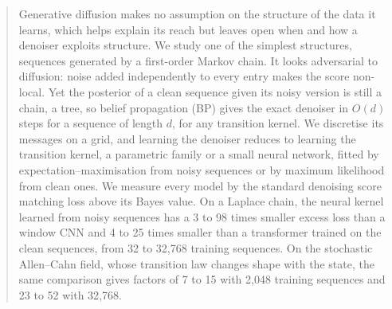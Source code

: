 \documentclass{article}
\begin{document}

\printAffiliationsAndNotice{}

\begin{abstract}
Generative diffusion makes no assumption on the structure of the data it learns, which helps explain its reach but
leaves open when and how a denoiser exploits structure. We study one of the simplest structures, sequences generated by
a first-order Markov chain. It looks adversarial to diffusion: noise added independently to every entry makes the score
non-local. Yet the posterior of a clean sequence given its noisy version is still a chain, a tree, so belief propagation
(BP) gives the exact denoiser in $O(d)$ steps for a sequence of length $d$, for any transition kernel. We discretise
its messages on a grid, and learning the denoiser reduces to learning the transition kernel, a parametric family or a
small neural network, fitted by expectation--maximisation from noisy sequences or by maximum likelihood from clean
ones. We measure every model by the standard denoising score matching loss above its Bayes value. On a Laplace chain,
the neural kernel learned from noisy sequences has a 3 to 98 times smaller excess loss than a window CNN and 4 to 25
times smaller than a transformer trained on the clean sequences, from 32 to 32{,}768 training sequences. On the
stochastic Allen--Cahn field, whose transition law changes shape with the state, the same comparison gives factors of 7
to 15 with 2{,}048 training sequences and 23 to 52 with 32{,}768.
\end{abstract}
\end{document}
